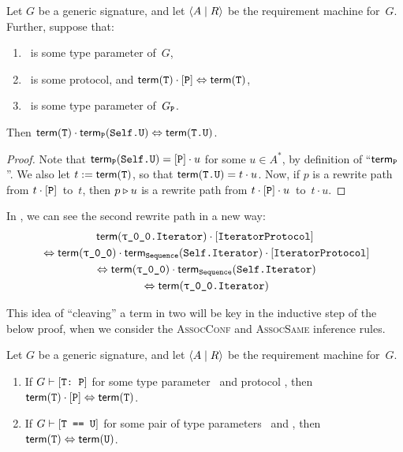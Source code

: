 \documentclass[../generics]{subfiles}
\begin{document}
\begin{lemma}\label{type param composition lemma}
Let $G$ be a generic signature, and let $\langle A \mid R\rangle$ be the requirement machine for~$G$. Further, suppose that:
\begin{enumerate}
\item \tT\ is some type parameter of~$G$,
\item \tP\ is some protocol, and $\mathsf{term}(\texttt{T})\cdot[\texttt{P}]\Leftrightarrow\mathsf{term}(\texttt{T})$,
\item \SelfU\ is some type parameter of~$G_{\texttt{P}}$.
\end{enumerate}
Then $\mathsf{term}(\texttt{T})\cdot\mathsf{term}_{\texttt{P}}(\texttt{Self.U}) \Leftrightarrow \mathsf{term}(\texttt{T.U})$.
\end{lemma}
\begin{proof}
Note that $\mathsf{term}_{\texttt{P}}(\texttt{Self.U})=[\texttt{P}]\cdot u$ for some $u\in A^*$, by definition of ``$\mathsf{term}_{\texttt{P}}$''. We also let $t := \mathsf{term}(\texttt{T})$, so that $\mathsf{term}(\texttt{T.U})=t\cdot u$. Now, if $p$ is a rewrite path from $t\cdot[\texttt{P}]$~to~$t$, then $p\triangleright u$ is a rewrite path from $t\cdot[\texttt{P}]\cdot u$~to~$t\cdot u$.
\end{proof}

\begin{example}
In , we can see the second rewrite path in a new way:
\begin{gather*}
\Term(\texttt{\rT.Iterator})\cdot\pIterator\\
{} \Eq \Term(\rT) \cdot \TermP{Sequence}(\texttt{Self.Iterator}) \cdot \pIterator\\
{} \Eq \Term(\rT) \cdot \TermP{Sequence}(\texttt{Self.Iterator})\\
{} \Eq \Term(\texttt{\rT.Iterator})
\end{gather*}
\end{example}

This idea of ``cleaving'' a term in two will be key in the inductive step of the below proof, when we consider the \textsc{AssocConf} and \textsc{AssocSame} inference rules.

\newcommand{\Path}{\mathsf{path}\,}

\begin{theorem}\label{derivation to path swift}
Let $G$ be a generic signature, and let $\langle A \mid R\rangle$ be the requirement machine for~$G$.
\begin{enumerate}
\item If $G\vdash[\texttt{T:~P}]$ for some type parameter \tT\ and protocol \tP, then $\mathsf{term}(\texttt{T})\cdot[\texttt{P}] \Leftrightarrow \mathsf{term}(\texttt{T})$.
\item If $G\vdash[\texttt{T == U}]$ for some pair of type parameters \tT\ and \tU, then $\mathsf{term}(\texttt{T}) \Leftrightarrow \mathsf{term}(\texttt{U})$.
\end{enumerate}
\end{theorem}
\end{document}
